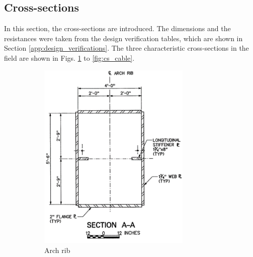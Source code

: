 \subsection{Cross-sections} \label{app:cross_sections}
In this section, the cross-sections are introduced. The dimensions and the resistances were taken from the design verification tables, which are shown in Section \ref{app:design_verifications}. The three characteristic cross-sections in the field are shown in Figs. \ref{fig:cs_arch} to \ref{fig:cs_cable}. 
\begin{figure}[H]
\centering
\begin{subfigure}{0.33\textwidth}
    \centering
    \vspace*{0.68cm}
    \includegraphics[width=0.8\textwidth]{overleaf/Appendix/Pictures/arch_3.PNG}
    \vspace*{0.68cm}
    \caption{Arch rib}
    \label{fig:cs_arch}
\end{subfigure}%
\begin{subfigure}{.33\textwidth}
    \centering

\end{subfigure}
\end{figure}
